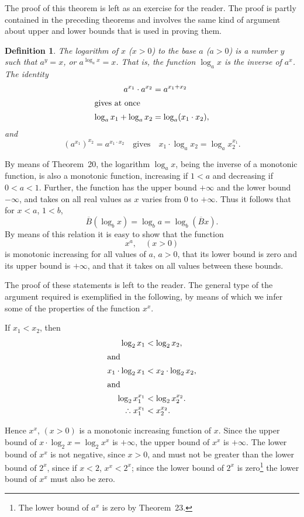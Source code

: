 \documentclass[a4paper,12pt]{book}[2004/02/16]
\providecommand{\therefore}{\mathrel{{.}\kern-.05em\raise.40em\hbox{.}\kern-.05em{.}}}
\providecommand{\hyperlink}[2]{#2}
\theoremstyle{ilemma}
\theoremstyle{itheorem}
\theoremstyle{iother}
\theoremstyle{icorollary}
\theoremstyle{numcorollary}
\theoremstyle{idefinition}
\newtheorem*{definition}{Definition}
\begin{document}
The proof of this theorem is left as an exercise for the reader.  The
proof is partly contained in the preceding theorems and
involves the same kind of argument about upper and lower bounds that
is used in proving them.

\begin{definition}
The \textit{logarithm} of $x$ ($x>0$) to the \textit{base} $a$ ($a>0$)
is a number $y$ such that $a^y=x$, or $a^{\log_a x}=x$. That is, the
function $\log_a x$ is the inverse of $a^x$. The identity
\begin{align*}
  a^{x_1} \cdot a^{x_2} &= a^{x_1 + x_2}\\
\intertext{gives at once}
\log_a x_1 + \log_a x_2 &= \log_a (x_1 \cdot x_2),
\end{align*}
and
\[
  (a^{x_1})^{x_2}=a^{x_1 \cdot x_2}\quad\text{gives}\quad
  x_1\cdot \log_a x_2 = \log_a x_2^{x_1}.
\]
\end{definition}

By means of Theorem~\hyperlink{thm20}{20}, the logarithm $\log_a x$, being the inverse of
a monotonic function, is also a monotonic function, increasing if $1 <
a$ and decreasing if $0<a<1$. Further, the function has the upper
bound $+\infty$ and the lower bound $-\infty$, and takes on all real
values as $x$ varies from $0$ to $+\infty$. Thus it follows that for
$x<a$, $1<b$,
\[
  \overline{B}(\log_b x) = \log_b a = \log_b(\overline{B}x).
\]
By means of this relation it is easy to show that the function
\[
  x^a,\quad (x>0)
\]
is monotonic increasing for all values of $a$, $a>0$, that its lower
bound is zero and its upper bound is $+\infty$, and that it takes on
all values between these bounds.

The proof of these statements is left to the reader. The general type
of the argument required is exemplified in the following, by means of
which we infer some of the properties of the function $x^x$.

If $x_1<x_2$, then
\begin{align*}
  \log_2x_1&<\log_2x_2,\\
\intertext{and}
  x_1 \cdot \log_2 x_1 &< x_2 \cdot \log_2 x_2,\\
\intertext{and}
  \log_2 x_1^{x_1} &< \log_2 x_2^{x_2}.\\
\therefore x_1^{x_1} &< x_2^{x_2}.
\end{align*}

Hence $x^x$, $(x>0)$ is a monotonic increasing function of $x$.  Since
the upper bound of $x\cdot\log_2x=\log_2x^x$ is $+\infty$, the upper
bound of $x^x$ is $+\infty$. The lower bound of $x^x$ is not negative,
since $x>0$, and must not be greater than the lower bound of $2^x$,
since if $x<2$, $x^x<2^x$; since the lower bound of $2^x$ is
zero\footnote{%
    The lower bound of $a^x$ is zero by Theorem~\hyperlink{thm23}{23}.}
the lower bound of $x^x$ must also be zero.
\end{document}
